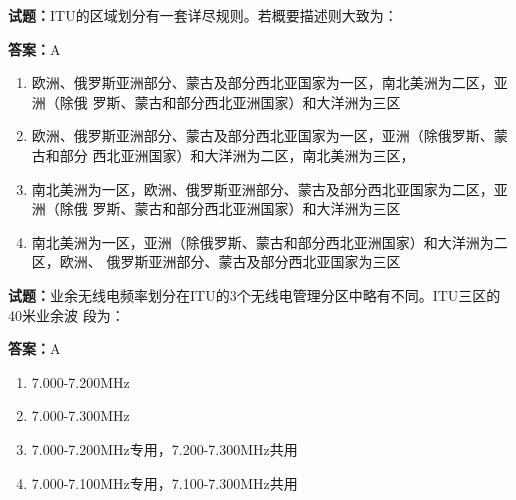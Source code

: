 \documentclass{ctexbook}
\begin{document}




\vspace{1em}

\textbf{试题：}ITU的区域划分有一套详尽规则。若概要描述则大致为： 

\textbf{答案：}A 

\begin{enumerate}[leftmargin=3em]
  \item 欧洲、俄罗斯亚洲部分、蒙古及部分西北亚国家为一区，南北美洲为二区，亚洲（除俄
罗斯、蒙古和部分西北亚洲国家）和大洋洲为三区 

  \item 欧洲、俄罗斯亚洲部分、蒙古及部分西北亚国家为一区，亚洲（除俄罗斯、蒙古和部分
西北亚洲国家）和大洋洲为二区，南北美洲为三区， 

  \item 南北美洲为一区，欧洲、俄罗斯亚洲部分、蒙古及部分西北亚国家为二区，亚洲（除俄
罗斯、蒙古和部分西北亚洲国家）和大洋洲为三区 

  \item 南北美洲为一区，亚洲（除俄罗斯、蒙古和部分西北亚洲国家）和大洋洲为二区，欧洲、
俄罗斯亚洲部分、蒙古及部分西北亚国家为三区 

\end{enumerate}





\vspace{1em}

\textbf{试题：}业余无线电频率划分在ITU的3个无线电管理分区中略有不同。ITU三区的40米业余波
段为： 

\textbf{答案：}A 

\begin{enumerate}[leftmargin=3em]
  \item 7.000-7.200MHz 

  \item 7.000-7.300MHz 

  \item 7.000-7.200MHz专用，7.200-7.300MHz共用 

  \item 7.000-7.100MHz专用，7.100-7.300MHz共用 

\end{enumerate}


\end{document}
